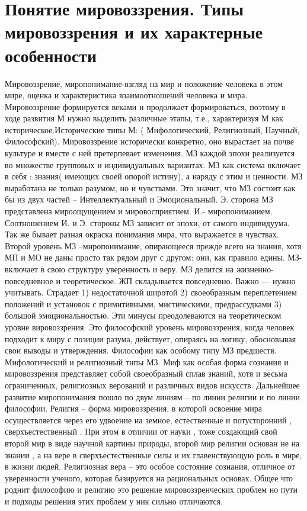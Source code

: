 \documentclass[12pt]{article}
\begin{document}
\newpage
\section{Понятие мировоззрения. Типы мировоззрения и их характерные особенности}
Мировоззрение, миропонимание-взгляд на мир и положение человека в этом мире, оценка и характеристика
взаимоотношений человека и мира. Мировоззрение формируется веками и продолжает формироваться, поэтому
в ходе развития М нужно выделить различные этапы, т.е., характеризуя М как историческое.Исторические типы
М: ( Мифологический, Религиозный, Научный, Философский). 
Мировоззрение   исторически  конкретно,  оно  вырастает  на  почве  культуре  и  вместе  с  ней  претерпевает
изменения. МЗ каждой эпохи  реализуется во  множестве  групповых  и индивидуальных  вариантах.  МЗ  как
система включает в себя : знания( имеющих своей опорой истину), а наряду с этим и ценности. МЗ выработана
не только разумом, но и чувствами. Это значит, что МЗ состоит как бы из двух частей – Интеллектуальный и
Эмоциональный.  Э.  сторона  МЗ  представлена  мироощущением  и  мировосприятием.  И.-  миропониманием.
Соотношением И. и Э. стороны МЗ зависит от эпохи, от самого индивидуума. Так же бывает разная окраска
понимания мира, что выражается в чувствах. Второй уровень МЗ –миропонимание, опирающееся прежде всего
на знания, хотя МП и МО не даны просто так рядом друг с другом: они, как правило едины. МЗ- включает в
свою структуру уверенность и веру. МЗ делится на жизненно-повседневное и теоретическое. ЖП складывается
повседневно. Важно — нужно учитывать. Страдает 1) недостаточной широтой 2) своеобразным переплетением 
положений и установок с примитивными, мистическими, предрассудками 3) большой эмоциональностью. Эти
минусы преодолеваются на теоретическом уровне вировоззрения. Это философский уровень мировоззрения,
когда человек подходит к миру с позиции разума, действует, опираясь на логику, обосновывая свои выводы и
утверждения.
Философии как особому типу МЗ предшеств. Мифологический и религиозный типы МЗ.
Миф как особая форма сознания и мировоззрения представляет собой своеобразный сплав знаний, хотя и
весьма ограниченных, религиозных верований и различных видов искусств.
Дальнейшее развитие миропонимания пошло по двум линиям – по линии религии и по линии философии.
Религия  –  форма мировоззрения, в которой освоение мира осуществляется через его удвоение на земное,
естественные и потусторонний , сверхъестественный . При этом в отличии от науки , тоже создающий свой
второй  мир  в  виде  научной  картины  природы,  второй  мир  религии  основан  не  на  знании  ,  а  на  вере  в
сверхъестественные силы и их главенствующую роль в мире, в жизни людей. Религиозная вера – это особое
состояние сознания, отличное от уверенности ученого, которая базируется на рациональных основах.
Общее что роднит философию и религию это решение мировоззренческих проблем но пути и подходы решения
этих проблем у ник сильно отличаются.
\end{document}
